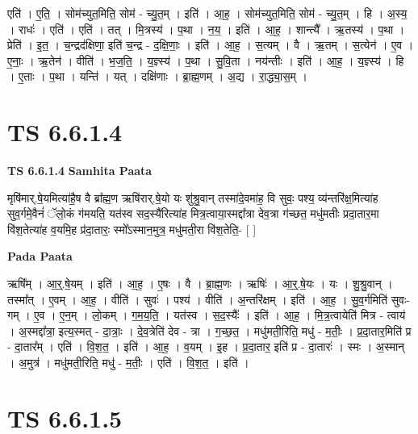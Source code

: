 \documentclass[17pt]{extarticle}
\begin{document}
एति॑ । ए॒ति॒ । सोम॑च्युत॒मिति॒ सोम॑ - च्यु॒त॒म् । इति॑ । आ॒ह॒ । सोम॑च्युत॒मिति॒ सोम॑ - च्यु॒त॒म् । हि । अ॒स्य॒ । राधः॑ । एति॑ । एति॑ । तत् । मि॒त्रस्य॑ । प॒था । न॒य॒ । इति॑ । आ॒ह॒ । शान्त्यै᳚ । ऋ॒तस्य॑ । प॒था । प्रेति॑ । इ॒त॒ । च॒न्द्रद॑क्षिणा॒ इति॑ च॒न्द्र - द॒क्षि॒णाः॒ । इति॑ । आ॒ह॒ । स॒त्यम् । वै । ऋ॒तम् । स॒त्येन॑ । ए॒व । ए॒नाः॒ । ऋ॒तेन॑ । वीति॑ । भ॒ज॒ति॒ । य॒ज्ञ्स्य॑ । प॒था । सु॒वि॒ता । नय॑न्तीः । इति॑ । आ॒ह॒ । य॒ज्ञ्स्य॑ । हि । ए॒ताः । प॒था । यन्ति॑ । यत् । दक्षि॑णाः । ब्रा॒ह्म॒णम् । अ॒द्य । रा॒द्ध्या॒स॒म् ।  \newline




\section*{ TS 6.6.1.4 }

\textbf{TS 6.6.1.4 } \newline
\textbf{Samhita Paata} \newline

मृषि॑मार्.षे॒यमित्या॑है॒ष वै ब्रा᳚ह्म॒ण ऋषि॑रार्.षे॒यो यः शु॑श्रु॒वान् तस्मा॑दे॒वमा॑ह॒ वि सुवः॒ पश्य॒ व्य॑न्तरि॑क्ष॒मित्या॑ह सुव॒र्गमे॒वैनं॑ ॅलो॒कं ग॑मयति॒ यत॑स्व सद॒स्यै॑रित्या॑ह मित्र॒त्वाया॒स्मद्दा᳚त्रा देव॒त्रा ग॑च्छत॒ मधु॑मतीः प्रदा॒तार॒मा वि॑श॒तेत्या॑ह व॒यमि॒ह प्र॑दा॒तारः॒ स्मो᳚ऽस्मान॒मुत्र॒ मधु॑मती॒रा वि॑श॒तेति॒- [  ] \newline

\textbf{Pada Paata} \newline

ऋषि᳚म् । आ॒र्॒.षे॒यम् । इति॑ । आ॒ह॒ । ए॒षः । वै । ब्रा॒ह्म॒णः । ऋषिः॑ । आ॒र्॒.षे॒यः । यः । शु॒श्रु॒वान् । तस्मा᳚त् । ए॒वम् । आ॒ह॒ । वीति॑ । सुवः॑ । पश्य॑ । वीति॑ । अ॒न्तरि॑क्षम् । इति॑ । आ॒ह॒ । सु॒व॒र्गमिति॑ सुवः-गम् । ए॒व । ए॒न॒म् । लो॒कम् । ग॒म॒य॒ति॒ । यत॑स्व । स॒द॒स्यैः᳚ । इति॑ । आ॒ह॒ । मि॒त्र॒त्वायेति॑ मित्र - त्वाय॑ । अ॒स्मद्दा᳚त्रा॒ इत्य॒स्मत् - दा॒त्राः॒ । दे॒व॒त्रेति॑ देव - त्रा । ग॒च्छ॒त॒ । मधु॑मती॒रिति॒ मधु॑ - म॒तीः॒ । प्र॒दा॒तार॒मिति॑ प्र - दा॒तार᳚म् । एति॑ । वि॒श॒त॒ । इति॑ । आ॒ह॒ । व॒यम् । इ॒ह । प्र॒दा॒तार॒ इति॑ प्र - दा॒तारः॑ । स्मः । अ॒स्मान् । अ॒मुत्र॑ । मधु॑मती॒रिति॒ मधु॑ - म॒तीः॒ । एति॑ । वि॒श॒त॒ । इति॑ ।  \newline




\section*{ TS 6.6.1.5 }
\end{document}
